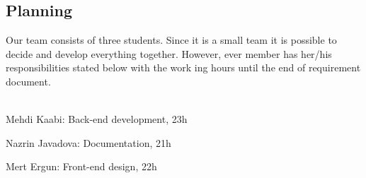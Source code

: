 \newpage

\begin{center}
\section{Planning}
\end{center}

\par Our team consists of three students. Since it is a small team it is possible to decide and develop
everything together. However, ever member has her/his responsibilities stated below with the work
ing hours until the end of requirement document.\\
\\

\par Mehdi Kaabi: Back-end development, 23h 
\par Nazrin Javadova: Documentation, 21h
\par Mert Ergun: Front-end design, 22h

